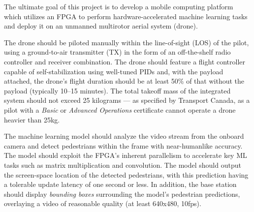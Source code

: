 The ultimate goal of this project is to develop a mobile computing platform which utilizes an FPGA to perform hardware-accelerated machine learning tasks and deploy it on an unmanned multirotor aerial system (drone). 

The drone should be piloted manually within the line-of-sight (LOS) of the pilot, using a ground-to-air transmitter (TX) in the form of an off-the-shelf radio controller and receiver combination. The drone should feature a flight controller capable of self-stabilization using well-tuned PIDs and,
with the payload attached, the drone's flight duration should be at least 50\% of that without the payload (typically 10--15 minutes).
The total takeoff mass of the integrated system should not exceed 25 kilograms --- as specified by Transport Canada, as a pilot with a \textit{Basic} or \textit{Advanced Operations} certificate cannot operate a drone heavier than 25kg\cite{trans-canada}.

The machine learning model should analyze the video stream from the onboard camera and detect pedestrians within the frame with near-humanlike accuracy. The model should exploit the FPGA's inherent parallelism to accelerate key ML tasks such as matrix multiplication and convolution. The model should output the screen-space location of the detected pedestrians, with this prediction having a tolerable update latency of one second or less. In addition, the base station should display \textit{bounding boxes} surrounding the model's pedestrian predictions, overlaying a video of reasonable quality (at least 640x480, 10fps).
